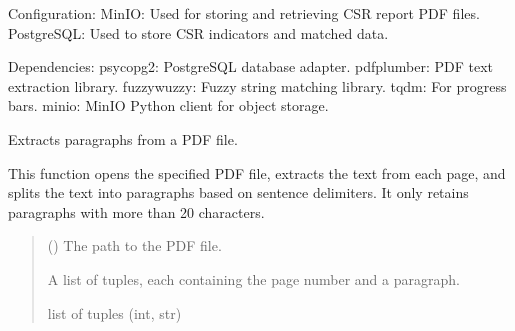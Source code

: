 \documentclass[letterpaper,10pt,english]{sphinxmanual}
\begin{document}
\sphinxAtStartPar
Configuration:
\sphinxhyphen{} MinIO: Used for storing and retrieving CSR report PDF files.
\sphinxhyphen{} PostgreSQL: Used to store CSR indicators and matched data.

\sphinxAtStartPar
Dependencies:
\sphinxhyphen{} psycopg2: PostgreSQL database adapter.
\sphinxhyphen{} pdfplumber: PDF text extraction library.
\sphinxhyphen{} fuzzywuzzy: Fuzzy string matching library.
\sphinxhyphen{} tqdm: For progress bars.
\sphinxhyphen{} minio: MinIO Python client for object storage.

\begin{fulllineitems}
\label{\detokenize{modules.data_storage:modules.data_storage.retry_failed_reports.extract_paragraphs_from_pdf}}
\pysigstartsignatures
\pysiglinewithargsret
{}
{}
{}
\pysigstopsignatures
\sphinxAtStartPar
Extracts paragraphs from a PDF file.

\sphinxAtStartPar
This function opens the specified PDF file, extracts the text from each page,
and splits the text into paragraphs based on sentence delimiters. It only retains
paragraphs with more than 20 characters.
\begin{quote}\begin{description}
\sphinxAtStartPar
{} () \textendash{} The path to the PDF file.

\sphinxAtStartPar
A list of tuples, each containing the page number and a paragraph.

\sphinxAtStartPar
list of tuples (int, str)

\end{description}\end{quote}

\end{fulllineitems}

\end{document}

